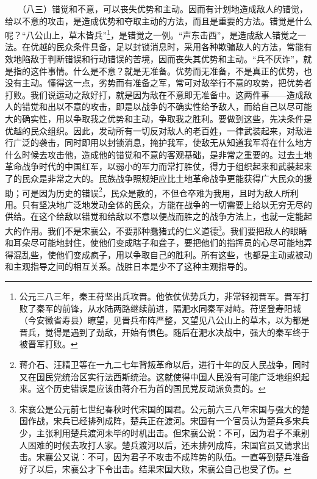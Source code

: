 \documentclass[cn,11pt,chinese]{elegantbook}
\begin{document}
　　（八三）错觉和不意，可以丧失优势和主动。因而有计划地造成敌人的错觉，给以不意的攻击，是造成优势和夺取主动的方法，而且是重要的方法。错觉是什么呢？“八公山上，草木皆兵”\footnote[34]{ 公元三八三年，秦王苻坚出兵攻晋。他依仗优势兵力，非常轻视晋军。晋军打败了秦军的前锋，从水陆两路继续前进，隔淝水同秦军对峙。苻坚登寿阳城（今安徽省寿县）瞭望，见晋兵布阵严整，又望见八公山上的草木，以为都是晋兵，觉得是遇到了劲敌，开始有惧色。随后在淝水决战中，强大的秦军终于被晋军打败。}，是错觉之一例。“声东击西”，是造成敌人错觉之一法。在优越的民众条件具备，足以封锁消息时，采用各种欺骗敌人的方法，常能有效地陷敌于判断错误和行动错误的苦境，因而丧失其优势和主动。“兵不厌诈”，就是指的这件事情。什么是不意？就是无准备。优势而无准备，不是真正的优势，也没有主动。懂得这一点，劣势而有准备之军，常可对敌举行不意的攻势，把优势者打败。我们说运动之敌好打，就是因为敌在不意即无准备中。这两件事——造成敌人的错觉和出以不意的攻击，即是以战争的不确实性给予敌人，而给自己以尽可能大的确实性，用以争取我之优势和主动，争取我之胜利。要做到这些，先决条件是优越的民众组织。因此，发动所有一切反对敌人的老百姓，一律武装起来，对敌进行广泛的袭击，同时即用以封锁消息，掩护我军，使敌无从知道我军将在什么地方什么时候去攻击他，造成他的错觉和不意的客观基础，是非常之重要的。过去土地革命战争时代的中国红军，以弱小的军力而常打胜仗，得力于组织起来和武装起来了的民众是非常之大的。民族战争照规矩应比土地革命战争更能获得广大民众的援助；可是因为历史的错误\footnote[35]{ 蒋介石、汪精卫等在一九二七年背叛革命以后，进行十年的反人民战争，同时又在国民党统治区实行法西斯统治。这就使得中国人民没有可能广泛地组织起来。这个历史错误是应该由蒋介石为首的国民党反动派负责的。}，民众是散的，不但仓卒难为我用，且时为敌人所利用。只有坚决地广泛地发动全体的民众，方能在战争的一切需要上给以无穷无尽的供给。在这个给敌以错觉和给敌以不意以便战而胜之的战争方法上，也就一定能起大的作用。我们不是宋襄公，不要那种蠢猪式的仁义道德\footnote[36]{ 宋襄公是公元前七世纪春秋时代宋国的国君。公元前六三八年宋国与强大的楚国作战，宋兵已经排列成阵，楚兵正在渡河。宋国有一个官员认为楚兵多宋兵少，主张利用楚兵渡河未毕的时机出击。但宋襄公说：不可，因为君子不乘别人困难的时候去攻打人家。楚兵渡河以后，还未排列成阵，宋国官员又请求出击。宋襄公又说：不可，因为君子不攻击不成阵势的队伍。一直等到楚兵准备好了以后，宋襄公才下令出击。结果宋国大败，宋襄公自己也受了伤。}。我们要把敌人的眼睛和耳朵尽可能地封住，使他们变成瞎子和聋子，要把他们的指挥员的心尽可能地弄得混乱些，使他们变成疯子，用以争取自己的胜利。所有这些，也都是主动或被动和主观指导之间的相互关系。战胜日本是少不了这种主观指导的。\\
\end{document}
